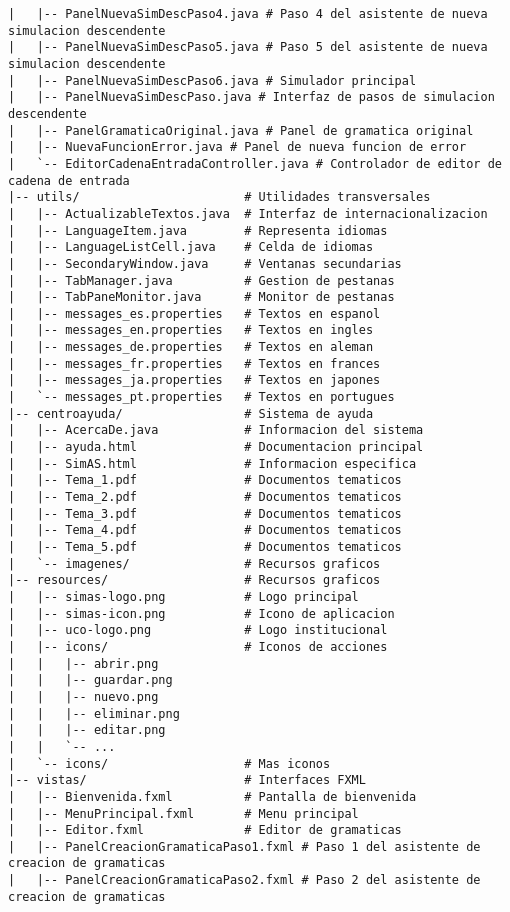 \begin{lstlisting}[caption=Estructura del código fuente]
|   |-- PanelNuevaSimDescPaso4.java # Paso 4 del asistente de nueva simulacion descendente
|   |-- PanelNuevaSimDescPaso5.java # Paso 5 del asistente de nueva simulacion descendente
|   |-- PanelNuevaSimDescPaso6.java # Simulador principal
|   |-- PanelNuevaSimDescPaso.java # Interfaz de pasos de simulacion descendente
|   |-- PanelGramaticaOriginal.java # Panel de gramatica original
|   |-- NuevaFuncionError.java # Panel de nueva funcion de error
|   `-- EditorCadenaEntradaController.java # Controlador de editor de cadena de entrada
|-- utils/                       # Utilidades transversales
|   |-- ActualizableTextos.java  # Interfaz de internacionalizacion
|   |-- LanguageItem.java        # Representa idiomas
|   |-- LanguageListCell.java    # Celda de idiomas
|   |-- SecondaryWindow.java     # Ventanas secundarias
|   |-- TabManager.java          # Gestion de pestanas
|   |-- TabPaneMonitor.java      # Monitor de pestanas
|   |-- messages_es.properties   # Textos en espanol
|   |-- messages_en.properties   # Textos en ingles
|   |-- messages_de.properties   # Textos en aleman
|   |-- messages_fr.properties   # Textos en frances
|   |-- messages_ja.properties   # Textos en japones
|   `-- messages_pt.properties   # Textos en portugues
|-- centroayuda/                 # Sistema de ayuda
|   |-- AcercaDe.java            # Informacion del sistema
|   |-- ayuda.html               # Documentacion principal
|   |-- SimAS.html               # Informacion especifica
|   |-- Tema_1.pdf               # Documentos tematicos
|   |-- Tema_2.pdf               # Documentos tematicos
|   |-- Tema_3.pdf               # Documentos tematicos
|   |-- Tema_4.pdf               # Documentos tematicos
|   |-- Tema_5.pdf               # Documentos tematicos
|   `-- imagenes/                # Recursos graficos
|-- resources/                   # Recursos graficos
|   |-- simas-logo.png           # Logo principal
|   |-- simas-icon.png           # Icono de aplicacion
|   |-- uco-logo.png             # Logo institucional
|   |-- icons/                   # Iconos de acciones
|   |   |-- abrir.png
|   |   |-- guardar.png
|   |   |-- nuevo.png
|   |   |-- eliminar.png
|   |   |-- editar.png
|   |   `-- ...
|   `-- icons/                   # Mas iconos
|-- vistas/                      # Interfaces FXML
|   |-- Bienvenida.fxml          # Pantalla de bienvenida
|   |-- MenuPrincipal.fxml       # Menu principal
|   |-- Editor.fxml              # Editor de gramaticas
|   |-- PanelCreacionGramaticaPaso1.fxml # Paso 1 del asistente de creacion de gramaticas
|   |-- PanelCreacionGramaticaPaso2.fxml # Paso 2 del asistente de creacion de gramaticas

\end{lstlisting}

